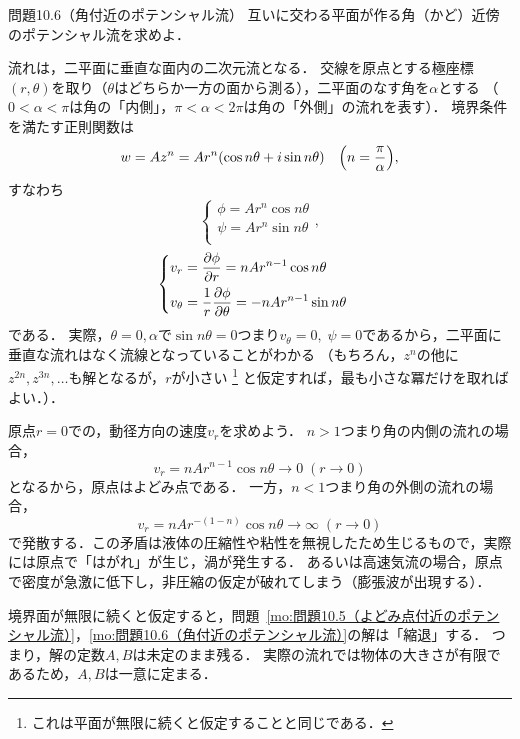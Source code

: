 \begin{mondai}{}{問題10.6（角付近のポテンシャル流）}
互いに交わる平面が作る角（かど）近傍のポテンシャル流を求めよ．
\end{mondai}
\begin{kaitou}
流れは，二平面に垂直な面内の二次元流となる．
交線を原点とする極座標$(r,\theta)$を取り（$\theta$はどちらか一方の面から測る），二平面のなす角を$\alpha$とする
（$0<\alpha<\pi$は角の「内側」，$\pi<\alpha<2\pi$は角の「外側」の流れを表す）．
境界条件を満たす正則関数は
\[
    w = Az^n = Ar^n (\cos n\theta + i \sin n\theta) \quad \pqty{n=\frac{\pi}{\alpha}} ,
\]
すなわち
\[
    \begin{cases}
        \phi = Ar^n \cos n\theta \\
        \psi = Ar^n \sin n\theta \\        
    \end{cases}, 
\]
\[
    \begin{cases}
        v_r = \dpdv{\phi}{r} = nAr^{n-1} \cos n\theta \\[7pt]
        v_\theta = \dfrac{1}{r}\dpdv{\phi}{\theta} = -nAr^{n-1} \sin n\theta \\
    \end{cases}
\]
である．
実際，$\theta=0,\alpha$で$\sin n\theta=0$つまり$v_\theta=0, \; \psi=0$であるから，二平面に垂直な流れはなく流線となっていることがわかる
（もちろん，$z^n$の他に$z^{2n}, z^{3n}, \ldots$も解となるが，$r$が小さい
\footnote{これは平面が無限に続くと仮定することと同じである．}
と仮定すれば，最も小さな冪だけを取ればよい．）．

原点$r=0$での，動径方向の速度$v_r$を求めよう．
$n>1$つまり角の内側の流れの場合，
\[
    v_r = nAr^{n-1} \cos n\theta \to 0 \; (r\to 0)
\]
となるから，原点はよどみ点である．
一方，$n<1$つまり角の外側の流れの場合，
\[
    v_r = nAr^{-(1-n)} \cos n\theta \to \infty \; (r\to 0)
\]
で発散する．この矛盾は液体の圧縮性や粘性を無視したため生じるもので，実際には原点で「はがれ」が生じ，渦が発生する．
あるいは高速気流の場合，原点で密度が急激に低下し，非圧縮の仮定が破れてしまう（膨張波が出現する）．

\end{kaitou}


\begin{details}
\spade
境界面が無限に続くと仮定すると，問題~\ref{mo:問題10.5（よどみ点付近のポテンシャル流）}，\ref{mo:問題10.6（角付近のポテンシャル流）}の解は「縮退」する．
つまり，解の定数$A,B$は未定のまま残る．
実際の流れでは物体の大きさが有限であるため，$A,B$は一意に定まる．
\end{details}



